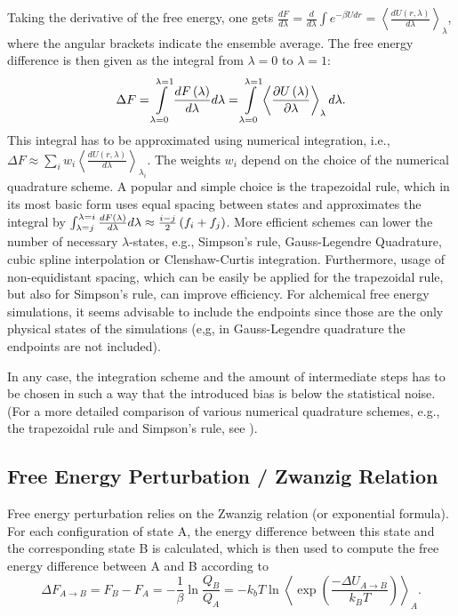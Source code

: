 Taking the derivative of the free energy, one gets $\frac{dF}{d\lambda}=\frac{d}{d\lambda}\int e^{-\beta U dr}=\left\langle \frac{dU\left(r,\lambda\right)}{d\lambda}\right\rangle _{\lambda}$\cite{Shirts.2013}, 
where the angular brackets indicate the ensemble average.
The free energy difference is then given as the integral from $\lambda=0$ to $\lambda=1$:
\begin{equation}
\Delta F=
\intop_{\lambda=0}^{\lambda=1}\frac{dF\left(\lambda\right)}{d\lambda}d\lambda=
\intop_{\lambda=0}^{\lambda=1}\left\langle\frac{\partial U\left(\lambda\right)}{\partial\lambda}\right\rangle_\lambda d\lambda
.
\end{equation}
This integral has to be approximated using numerical integration, i.e., $\Delta F\approx\sum_{i}w_{i}\left\langle \frac{dU\left(r,\lambda\right)}{d\lambda}\right\rangle _{\lambda_{i}}$.
The weights $w_{i}$ depend on the choice of the numerical quadrature scheme.
A popular and simple choice is the trapezoidal rule, which in its most basic form uses equal
spacing between states and approximates the integral by $\intop_{\lambda=j}^{\lambda=i}\frac{dF\left(\lambda\right)}{d\lambda}d\lambda\approx\frac{i-j}{2}\left(f_{i}+f_{j}\right)$.
More efficient schemes can lower the number of necessary ${\lambda}$-states, e.g., Simpson's rule, Gauss-Legendre Quadrature, cubic spline interpolation  or Clenshaw-Curtis integration. Furthermore, usage of non-equidistant spacing, which can be easily be applied for the trapezoidal rule, but also for Simpson's rule, can improve efficiency.
For alchemical free energy simulations, it seems advisable to include the endpoints since those are the only physical states of the simulations (e,g, in Gauss-Legendre quadrature the endpoints are not included). \cite{Bruckner.2011, Bruckner.2011b} 

In any case, the integration scheme and the amount of intermediate steps has to
be chosen in such a way that the introduced bias is below the statistical
noise\cite{Shirts.2013}. (For a more detailed comparison of various numerical quadrature
schemes, e.g., the trapezoidal rule and Simpson's rule, see \cite{Bruckner.2011b}). 

\subsection{Free Energy Perturbation / Zwanzig Relation}

Free energy perturbation relies on the Zwanzig relation (or exponential
formula). For each configuration of state A, the energy difference
between this state and the corresponding state B is calculated, which is then used to compute the free energy difference between A and B according to \cite{Zwanzig.1954,Gapsys.2015}
\begin{equation}
\Delta F_{A\rightarrow B}=F_{B}-F_{A}=-\frac{1}{\beta}\ln\frac{Q_{B}}{Q_{A}}=-k_{b}T\ln\left\langle \exp\left(\frac{-\Delta U_{A\rightarrow B}}{k_{B}T}\right)\right\rangle _{A}.
\end{equation}

